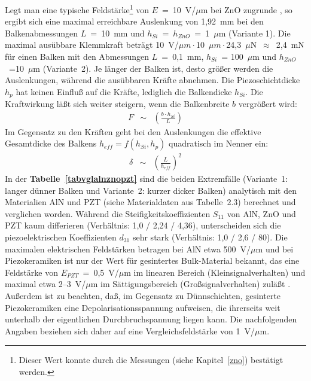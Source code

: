 Legt man eine typische Feldstärke\footnote{Dieser Wert konnte durch die
Messungen (siehe Kapitel~\ref{zno}) bestätigt werden.} von $E$~=~10~V/$\mu$m
bei ZnO zugrunde \cite{Smi92b}, so ergibt sich eine maximal erreichbare
Auslenkung von 1,92~mm bei den Balkenabmessungen $L$~=~10~mm und
$h_{Si}$~=~$h_{ZnO}$~=~1~$\mu$m (Variante 1). Die maximal ausübbare
Klemmkraft
beträgt 10~V/$\mu m \cdot$10~$\mu m \cdot$24,3~$\mu$N~$\approx$~2,4~mN
für einen Balken mit den
Abmessungen $L$~=~0,1~mm, $h_{Si}$~= 100~$\mu$m und $h_{ZnO}$~=10~$\mu$m
(Variante~2).
Je länger der Balken ist, desto größer werden die Auslenkungen, während
die ausübbaren Kräfte abnehmen. Die Piezoschichtdicke $h_{p}$
hat keinen Einfluß auf die Kräfte, lediglich die Balkendicke $h_{Si}$.
Die Kraftwirkung läßt sich weiter steigern, wenn die Balkenbreite $b$
vergrößert wird:
\begin{eqnarray}
\label{Fskal}
   F & \sim & \left( \frac{b \cdot h_{Si}}{L} \right)
\end{eqnarray}
Im Gegensatz zu den Kräften geht bei den Auslenkungen die effektive
Gesamtdicke des Balkens $ h_{eff} = f(h_{Si}, h_{p}) $ quadratisch
im Nenner ein:
\begin{eqnarray}
\label{dskal}
   \delta & \sim & \left( \frac{L}{h_{eff}} \right)^{2}
\end{eqnarray}
In der {\bf Tabelle~\ref{tabvglalnznopzt}}
sind die beiden Extremfälle (Variante~1: langer
dünner Balken und Variante~2: kurzer dicker Balken) analytisch mit den
Materialien AlN und PZT (siehe Materialdaten aus Tabelle~2.3) berechnet
und verglichen worden. Während die Steifigkeitskoeffizienten $S_{11}$
von AlN, ZnO und PZT kaum differieren (Verhältnis: 1,0 / 2,24 / 4,36),
unterscheiden sich die piezoelektrischen Koeffizienten $d_{31}$
sehr stark (Verhältnis: 1,0 / 2,6 / 80).
Die maximalen elektrischen Feldstärken betragen bei AlN etwa 500~V/$\mu$m
\cite{Fra88, Ger81} und bei Piezokeramiken ist nur der Wert für gesintertes
Bulk-Material bekannt, das eine Feldstärke von $E_{PZT}$~=~0,5~V/$\mu$m
im linearen Bereich (Kleinsignalverhalten) und maximal etwa 2--3~V/$\mu$m
im Sättigungsbereich (Großsignalverhalten) zuläßt \cite{VIB}. Außerdem ist zu
beachten, daß, im Gegensatz zu Dünnschichten, gesinterte Piezokeramiken eine
Depolarisationsspannung aufweisen, die ihrerseits weit unterhalb der
eigentlichen Durchbruchspannung liegen kann. Die nachfolgenden Angaben
beziehen sich daher auf eine Vergleichsfeldstärke von 1~V/$\mu$m.
